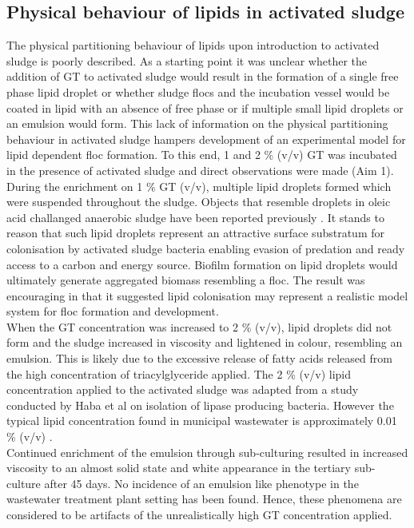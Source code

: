 \documentclass[twoside]{article}
\begin{document}
\subsection{Physical behaviour of lipids in activated sludge}
The physical partitioning behaviour of lipids upon introduction to activated sludge is poorly described. As a starting point it was unclear whether the addition of GT to activated sludge would result in the formation of a single free phase lipid droplet or whether sludge flocs and the incubation vessel would be coated in lipid with an absence of free phase or if multiple small lipid droplets or an emulsion would form. This lack of information on the physical partitioning behaviour in activated sludge hampers development of an experimental model for lipid dependent floc formation. To this end, 1 and 2 \% (v/v) GT was incubated in the presence of activated sludge and direct observations were made (Aim 1). \\

During the enrichment on 1 \% GT (v/v), multiple lipid droplets formed which were suspended throughout the sludge. Objects that resemble droplets in oleic acid challanged anaerobic sludge have been reported previously \cite{pereira2005anaerobic}. It stands to reason that such lipid droplets represent an attractive surface substratum for colonisation by activated sludge bacteria enabling evasion of predation and ready access to a carbon and energy source. Biofilm formation on lipid droplets would ultimately generate aggregated biomass resembling a floc. The result was encouraging in that it suggested lipid colonisation may represent a realistic model system for floc formation and development. \\

When the GT concentration was increased to 2 \% (v/v), lipid droplets did not form and the sludge increased in viscosity and lightened in colour, resembling an emulsion. This is likely due to the excessive release of fatty acids released from the high concentration of triacylglyceride applied. The 2 \% (v/v) lipid concentration applied to the activated sludge was adapted from a study conducted by Haba et al \cite{haba2000isolation} on isolation of lipase producing bacteria. However the typical lipid concentration found in municipal wastewater is approximately 0.01 \% (v/v) \cite{Forster_92}. \\

Continued enrichment of the emulsion through sub-culturing resulted in increased viscosity to an almost solid state and white appearance in the tertiary sub-culture after 45 days. No incidence of an emulsion like phenotype in the wastewater treatment plant setting has been found. Hence, these phenomena are considered to be artifacts of the unrealistically high GT concentration applied.
\end{document}
